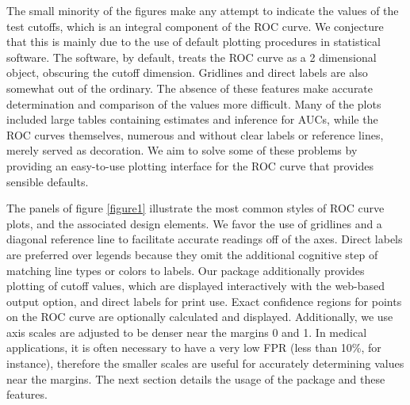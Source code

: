 \documentclass[article]{jss}
\begin{document}
The small minority of the figures make any attempt to indicate the
values of the test cutoffs, which is an integral component of the ROC
curve. We conjecture that this is mainly due to the use of default
plotting procedures in statistical software. The software, by default,
treats the ROC curve as a 2 dimensional object, obscuring the cutoff
dimension. Gridlines and direct labels are also somewhat out of the
ordinary. The absence of these features make accurate determination and
comparison of the values more difficult. Many of the plots included
large tables containing estimates and inference for AUCs, while the ROC
curves themselves, numerous and without clear labels or reference lines,
merely served as decoration. We aim to solve some of these problems by
providing an easy-to-use plotting interface for the ROC curve that
provides sensible defaults.

The panels of figure \ref{figure1} illustrate the most common styles of
ROC curve plots, and the associated design elements. We favor the use of
gridlines and a diagonal reference line to facilitate accurate readings
off of the axes. Direct labels are preferred over legends because they
omit the additional cognitive step of matching line types or colors to
labels. Our  package additionally provides plotting of
cutoff values, which are displayed interactively with the web-based
output option, and direct labels for print use. Exact confidence regions
for points on the ROC curve are optionally calculated and displayed.
Additionally, we use axis scales are adjusted to be denser near the
margins 0 and 1. In medical applications, it is often necessary to have
a very low FPR (less than 10\%, for instance), therefore the smaller
scales are useful for accurately determining values near the margins.
The next section details the usage of the  
package and these features.
\end{document}
